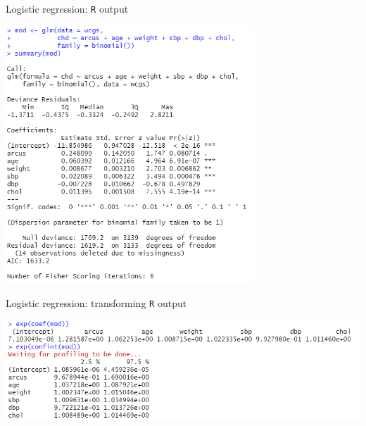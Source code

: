 \documentclass[10pt,t]{beamer}
\begin{document}
\begin{frame}{Logistic regression: \texttt{R} output}
	\vspace{-1cm}
		\begin{center}
		\includegraphics[width=0.7\textwidth]{./figs/multiple_logistic_regression_arcus}
	\end{center}
\end{frame}

\begin{frame}{Logistic regression: transforming \texttt{R} output}
	\vspace{-0.7cm}
	\begin{center}
		\includegraphics[width=\textwidth]{./figs/multiple_logistic_regression_arcus_exp}
	\end{center}
\end{frame}
\end{document}
